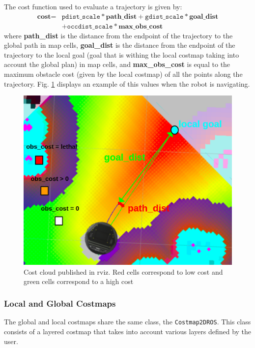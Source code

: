 The cost function used to evaluate a trajectory is given by:
\begin{align*}
        \textbf{cost} = &
   \texttt{pdist\_scale} * \textbf{path\_dist}
   + \texttt{gdist\_scale} * \textbf{goal\_dist}\\
   &+\texttt{occdist\_scale} * \textbf{max\_obs\_cost} 
\end{align*}
where \textbf{path\_dist} is the distance from the endpoint of the trajectory to the global path in map cells, \textbf{goal\_dist} is the distance from the endpoint of the trajectory to the local goal (goal that is withing the local costmap taking into account the global plan)  in map cells, and \textbf{max\_obs\_cost} is equal to the maximum obstacle cost (given by the local costmap) of all the points along the trajectory.
Fig. \ref{fig:costcloud} displays an example of this values when the robot is navigating.
\begin{figure}[!htb]
    \centering
    \includegraphics[width=0.8\linewidth]{imgs/chapter3/costcloud.png}
    \caption[Cost cloud published in rviz]{Cost cloud published in rviz. Red cells correspond to low cost and green cells correspond to a high cost}
    \label{fig:costcloud}
\end{figure}
\subsubsection{Local and Global Costmaps}
The global and local costmaps share the same class, the  \texttt{Costmap2DROS}. This class consists of a layered costmap that takes into account various layers defined by the user.

